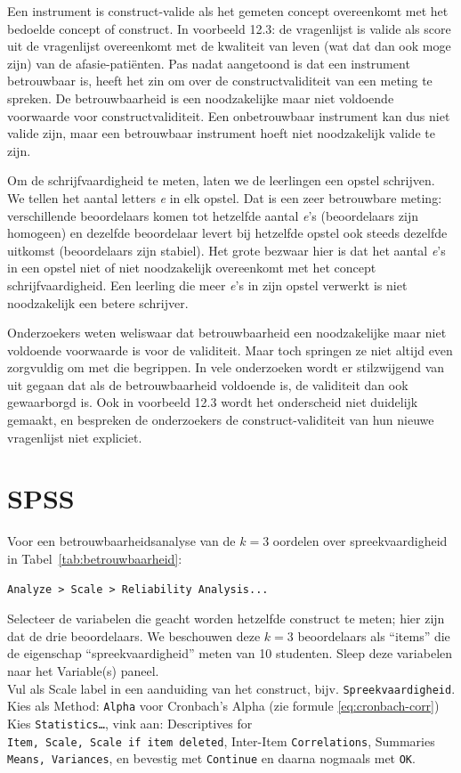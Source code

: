 \documentclass[
]{book}
\begin{document}
Een instrument is construct-valide als het gemeten concept overeenkomt
met het bedoelde concept of construct. In
voorbeeld 12.3: de vragenlijst is valide als score uit de
vragenlijst overeenkomt met de kwaliteit van leven (wat dat dan ook moge
zijn) van de afasie-patiënten. Pas nadat aangetoond is dat een
instrument betrouwbaar is, heeft het zin om over de constructvaliditeit
van een meting te spreken. De betrouwbaarheid is een noodzakelijke maar
niet voldoende voorwaarde voor constructvaliditeit. Een onbetrouwbaar
instrument kan dus niet valide zijn, maar een betrouwbaar instrument
hoeft niet noodzakelijk valide te zijn.

Om de schrijfvaardigheid te meten, laten we de leerlingen een opstel
schrijven. We tellen het aantal letters \emph{e} in elk opstel. Dat is een
zeer betrouwbare meting: verschillende beoordelaars komen tot hetzelfde
aantal \emph{e}'s (beoordelaars zijn homogeen) en dezelfde beoordelaar levert
bij hetzelfde opstel ook steeds dezelfde uitkomst (beoordelaars zijn
stabiel). Het grote bezwaar hier is dat het aantal \emph{e}'s in een opstel
niet of niet noodzakelijk overeenkomt met het concept
schrijfvaardigheid. Een leerling die meer \emph{e}'s in zijn opstel verwerkt
is niet noodzakelijk een betere schrijver.

Onderzoekers weten weliswaar dat betrouwbaarheid een noodzakelijke maar
niet voldoende voorwaarde is voor de validiteit. Maar toch springen ze
niet altijd even zorgvuldig om met die begrippen. In vele onderzoeken
wordt er stilzwijgend van uit gegaan dat als de betrouwbaarheid
voldoende is, de validiteit dan ook gewaarborgd is. Ook in voorbeeld 12.3
wordt het onderscheid niet duidelijk gemaakt,
en bespreken de onderzoekers de construct-validiteit van hun nieuwe
vragenlijst niet expliciet.

\hypertarget{spss-9}{%
\section{SPSS}\label{spss-9}}

Voor een betrouwbaarheidsanalyse van de \(k=3\) oordelen over
spreekvaardigheid in
Tabel~\ref{tab:betrouwbaarheid}:\\

\begin{verbatim}
Analyze > Scale > Reliability Analysis...
\end{verbatim}

Selecteer de variabelen die geacht worden hetzelfde construct te meten;
hier zijn dat de drie beoordelaars. We beschouwen deze \(k=3\)
beoordelaars als ``items'' die de eigenschap ``spreekvaardigheid'' meten van
10 studenten. Sleep deze variabelen naar het Variable(s) paneel.\\
Vul als Scale label in een aanduiding van het construct, bijv.
\texttt{Spreekvaardigheid}.\\
Kies als Method: \texttt{Alpha} voor Cronbach's Alpha (zie formule
\eqref{eq:cronbach-corr})\\
Kies \texttt{Statistics\ldots{}}, vink aan: Descriptives for
\texttt{Item,\ Scale,\ Scale\ if\ item\ deleted}, Inter-Item \texttt{Correlations},
Summaries \texttt{Means,\ Variances}, en bevestig met \texttt{Continue} en daarna
nogmaals met \texttt{OK}.
\end{document}
